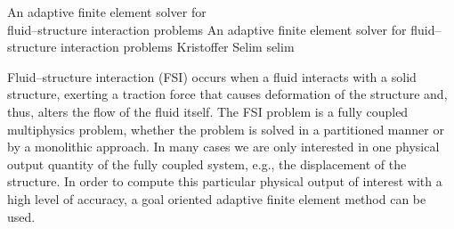               {An adaptive finite element solver for \\ fluid--structure interaction problems}
              {An adaptive finite element solver for fluid--structure interaction problems}
              {Kristoffer Selim}
              {selim}

\newcommand{\subdt}{\textrm{d}_t}
\newcommand{\divv}{\textrm{div}\;}
\newcommand{\Divv}{\textrm{Div}\;}
\newcommand{\uF}{u_{_{F}}}
\newcommand{\dotuF}{\dot{u}_{_{F}}}
\newcommand{\pF}{p_{_{F}}}
\newcommand{\rhoF}{\rho_{_{F}}}
\newcommand{\sigmaF}{\sigma_{_{F}}}
\newcommand{\sigmaFup}{\sigma_{_{F}}(u_{_{F}}, p_{_{F}})}
\newcommand{\sigmaS}{\sigma_{_{S}}}
\newcommand{\bff}{b_{_{F}}}
\newcommand{\graduF}{\textrm{grad}\;u_{_{F}}}
\newcommand{\US}{U_{_{S}}}
\newcommand{\uS}{u_{_{S}}}
\newcommand{\GradUS}{\textrm{Grad}\;U_{_{S}}}
\newcommand{\ddotUS}{\ddot{U}_{_{S}}}
\newcommand{\ddotuS}{\ddot{u}_{_{S}}}
\newcommand{\PS}{P_{_{S}}}
\newcommand{\rhoS}{\rho_{_{S}}}
\newcommand{\SigmaS}{\Sigma_{_{S}}}
\newcommand{\SigmaSU}{\Sigma_{_{S}}(U_{_{S}})}
\newcommand{\BS}{B_{_{S}}}
\newcommand{\M}{\mathcal{M}}
\newcommand{\E}{\mathcal{E}}
\newcommand{\oF}{\omega_{_{F}}}
\newcommand{\oS}{\omega_{_{S}}}
\newcommand{\OS}{\Omega_{_{S}}}
\newcommand{\OF}{\Omega_{_{F}}}
\newcommand{\PhiS}{\Phi_{_{S}}}
\newcommand{\PhiM}{\Phi_{_{M}}}
\newcommand{\FS}{F_{_{S}}}
\newcommand{\UM}{U_{_{M}}}
\newcommand{\SigmaM}{\Sigma_{_{M}}}
\newcommand{\GradUM}{\textrm{Grad}\;U_{_{M}}}
\newcommand{\UF}{U_{_{F}}}
\newcommand{\PF}{P_{_{F}}}
\newcommand{\AFF}{A_{_{FF}}}
\newcommand{\AFS}{A_{_{FS}}}
\newcommand{\AFM}{A_{_{FM}}}
\newcommand{\ASS}{A_{_{SS}}}
\newcommand{\ASF}{A_{_{SF}}}
\newcommand{\ASM}{A_{_{SM}}}
\newcommand{\AMM}{A_{_{MM}}}
\newcommand{\AMF}{A_{_{MF}}}
\newcommand{\AMS}{A_{_{MS}}}

Fluid--structure interaction (FSI) occurs when a fluid interacts with
a solid structure, exerting a traction force that causes deformation
of the structure and, thus, alters the flow of the fluid itself.  The
FSI problem is a fully coupled multiphysics problem, whether the
problem is solved in a partitioned manner or by a monolithic
approach. In many cases we are only interested in one
physical output quantity of the fully coupled system, e.g., the
displacement of the structure. In order to compute this particular
physical output of interest with a high level of accuracy, a goal
oriented adaptive finite element method can be used.

